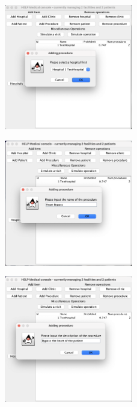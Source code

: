 \documentclass{article}
\begin{document}
\begin{figure}
  \begin{center}
    \includegraphics[width=0.5\textwidth]{./figures/Add/Procedure_1.png}
  \end{center}
\end{figure}

\begin{figure}
  \begin{center}
    \includegraphics[width=0.5\textwidth]{./figures/Add/Procedure_2.png}
  \end{center}
\end{figure}

\begin{figure}
  \begin{center}
    \includegraphics[width=0.5\textwidth]{./figures/Add/Procedure_3.png}
  \end{center}
\end{figure}
\end{document}
